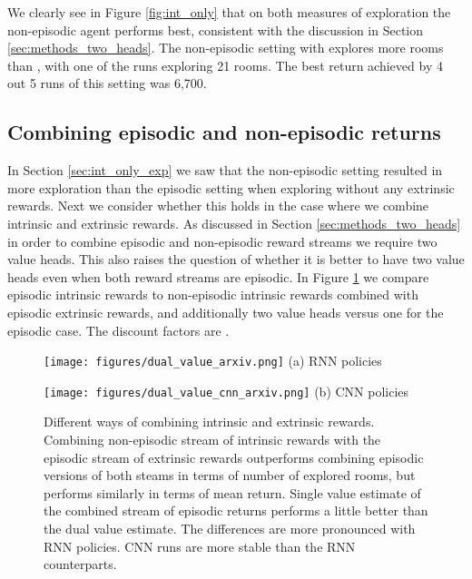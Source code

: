 \documentclass{article} \usepackage[dvipsnames]{xcolor}
\begin{document}
We clearly see in Figure \ref{fig:int_only} that on both measures of exploration the non-episodic agent performs best, consistent with the discussion in Section \ref{sec:methods_two_heads}. The non-episodic setting with  explores more rooms than , with one of the runs exploring 21 rooms. The best return achieved by 4 out 5 runs of this setting was 6,700. 

\subsection{Combining episodic and non-episodic returns}
\label{sec:exp_episodic}
In Section \ref{sec:int_only_exp} we saw that the non-episodic setting resulted in more exploration than the episodic setting when exploring without any extrinsic rewards. Next we consider whether this holds in the case where we combine intrinsic and extrinsic rewards. As discussed in Section \ref{sec:methods_two_heads} in order to combine episodic and non-episodic reward streams we require two value heads. This also raises the question of whether it is better to have two value heads even when both reward streams are episodic. In Figure \ref{fig:dual_value} we compare episodic intrinsic rewards to non-episodic intrinsic rewards combined with episodic extrinsic rewards, and additionally two value heads versus one for the episodic case. The discount factors are .

\begin{figure}[htbp]
\begin{minipage}{.48\textwidth}
\centering
\texttt{[image: figures/dual\_value\_arxiv.png]}
(a) RNN policies
\end{minipage}\hspace{.02\textwidth}
\begin{minipage}{.48\textwidth}
\centering
\texttt{[image: figures/dual\_value\_cnn\_arxiv.png]}
(b) CNN policies
\end{minipage}\vspace*{-4pt}
\caption{Different ways of combining intrinsic and extrinsic rewards. Combining non-episodic stream of intrinsic rewards with the episodic stream of extrinsic rewards outperforms combining episodic versions of both steams in terms of number of  explored rooms, but performs similarly in terms of mean return. Single value estimate of the combined stream of episodic returns performs a little better than the dual value estimate. The differences are more pronounced with RNN policies. CNN runs are more stable than the RNN counterparts.}
\label{fig:dual_value}
\end{figure}
\end{document}
